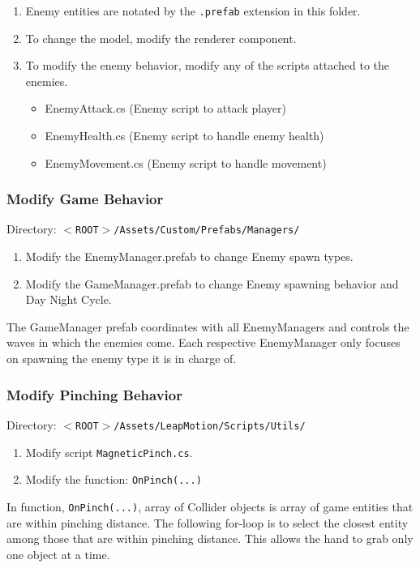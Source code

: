 \documentclass[a4paper]{refart}
\begin{document}
\begin{enumerate}
	\item Enemy entities are notated by the \texttt{.prefab} extension in this folder.
	\item To change the model, modify the renderer component.
	\item To modify the enemy behavior, modify any of the scripts attached to the enemies.
	\begin{itemize}
		\item EnemyAttack.cs (Enemy script to attack player)
		\item EnemyHealth.cs (Enemy script to handle enemy health)
		\item EnemyMovement.cs (Enemy script to handle movement)
	\end{itemize}
\end{enumerate}

\subsubsection{Modify Game Behavior}

Directory: \texttt{$<$ROOT$>$/Assets/Custom/Prefabs/Managers/}

\begin{enumerate}
	\item Modify the EnemyManager.prefab to change Enemy spawn types.
	\item Modify the GameManager.prefab to change Enemy spawning behavior and Day Night Cycle.
\end{enumerate}

The GameManager prefab coordinates with all EnemyManagers and controls the waves in which the enemies come. Each respective EnemyManager only focuses on spawning the enemy type it is in charge of.

\subsubsection{Modify Pinching Behavior}

Directory: \texttt{$<$ROOT$>$/Assets/LeapMotion/Scripts/Utils/}

\begin{enumerate}
	\item Modify script \texttt{MagneticPinch.cs}.
	\item Modify the function: \texttt{OnPinch(...)}
\end{enumerate}

In function, \texttt{OnPinch(...)}, array of Collider objects is array of game entities that are within pinching distance. The following for-loop is to select the closest entity among those that are within pinching distance. This allows the hand to grab only one object at a time.
\end{document}
